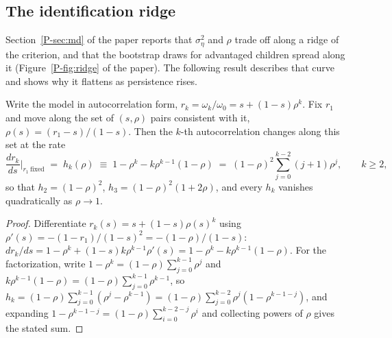 \subsection{The identification ridge}

Section~\ref{P-sec:md} of the paper reports that $\sigma^2_\eta$ and
$\rho$ trade off along a ridge of the criterion, and that the bootstrap
draws for advantaged children spread along it
(Figure~\ref{P-fig:ridge} of the paper). The following result describes
that curve and shows why it flattens as persistence rises.

\begin{proposition}
\label{fr:prop:ridge}
Write the model in autocorrelation form,
$r_k = \omega_k/\omega_0 = s + (1-s)\rho^k$. Fix $r_1$ and move along the
set of $(s, \rho)$ pairs consistent with it,
$\rho(s) = (r_1 - s)/(1-s)$. Then the $k$-th autocorrelation changes
along this set at the rate
\begin{equation}
\frac{d r_k}{d s}\Big|_{r_1\ \mathrm{fixed}} \;=\; h_k(\rho) \;\equiv\; 1 - \rho^{k} - k\rho^{k-1}(1-\rho)
\;=\; (1-\rho)^2\sum_{j=0}^{k-2}(j+1)\rho^{j},
\qquad k \ge 2,
\label{fr:eq:hk}
\end{equation}
so that $h_2 = (1-\rho)^2$, $h_3 = (1-\rho)^2(1+2\rho)$, and every $h_k$
vanishes quadratically as $\rho \to 1$.
\end{proposition}

\begin{proof}
Differentiate $r_k(s) = s + (1-s)\rho(s)^k$ using
$\rho'(s) = -(1-r_1)/(1-s)^2 = -(1-\rho)/(1-s)$:
$dr_k/ds = 1 - \rho^k + (1-s)k\rho^{k-1}\rho'(s) = 1 - \rho^k - k\rho^{k-1}(1-\rho)$.
For the factorization, write $1 - \rho^k = (1-\rho)\sum_{j=0}^{k-1}\rho^j$
and $k\rho^{k-1}(1-\rho) = (1-\rho)\sum_{j=0}^{k-1}\rho^{k-1}$, so
$h_k = (1-\rho)\sum_{j=0}^{k-1}(\rho^j - \rho^{k-1}) = (1-\rho)\sum_{j=0}^{k-2}\rho^j(1-\rho^{k-1-j})$,
and expanding $1 - \rho^{k-1-j} = (1-\rho)\sum_{i=0}^{k-2-j}\rho^i$ and
collecting powers of $\rho$ gives the stated sum.
\end{proof}


